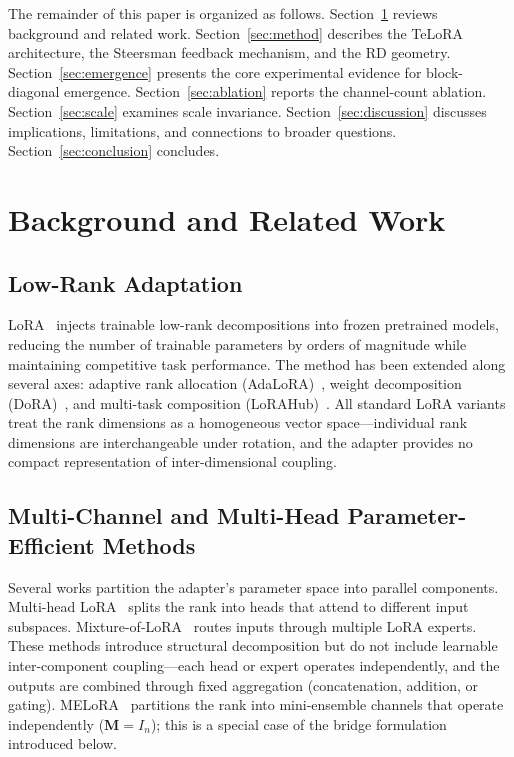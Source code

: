 \documentclass[11pt]{article}
\begin{document}
The remainder of this paper is organized as follows.
Section~\ref{sec:background} reviews background and related work.
Section~\ref{sec:method} describes the TeLoRA architecture, the
Steersman feedback mechanism, and the RD geometry.
Section~\ref{sec:emergence} presents the core experimental evidence
for block-diagonal emergence.
Section~\ref{sec:ablation} reports the channel-count ablation.
Section~\ref{sec:scale} examines scale invariance.
Section~\ref{sec:discussion} discusses implications, limitations, and
connections to broader questions.
Section~\ref{sec:conclusion} concludes.


\section{Background and Related Work}
\label{sec:background}

\subsection{Low-Rank Adaptation}

LoRA~\cite{hu2022lora} injects trainable low-rank decompositions into
frozen pretrained models, reducing the number of trainable parameters
by orders of magnitude while maintaining competitive task performance.
The method has been extended along several axes: adaptive rank
allocation (AdaLoRA)~\cite{zhang2023adalora}, weight decomposition
(DoRA)~\cite{liu2024dora}, and multi-task composition
(LoRAHub)~\cite{huang2023lorahub}. All standard LoRA variants treat
the rank dimensions as a homogeneous vector space---individual rank
dimensions are interchangeable under rotation, and the adapter
provides no compact representation of inter-dimensional coupling.

\subsection{Multi-Channel and Multi-Head Parameter-Efficient Methods}

\begin{sloppypar}
Several works partition the adapter's parameter space into parallel
components. Multi-head LoRA~\cite{wang2024multihead} splits the rank
into heads that attend to different input subspaces.
Mixture-of-LoRA~\cite{li2024moe} routes inputs through multiple LoRA
experts.  These methods introduce structural decomposition but do not
include learnable inter-component coupling---each head or expert
operates independently, and the outputs are combined through fixed
aggregation (concatenation, addition, or gating).
MELoRA~\cite{ren2024melora} partitions the rank into mini-ensemble
channels that operate independently ($\mathbf{M} = I_n$); this is a
special case of the bridge formulation introduced below.
\end{sloppypar}
\end{document}
